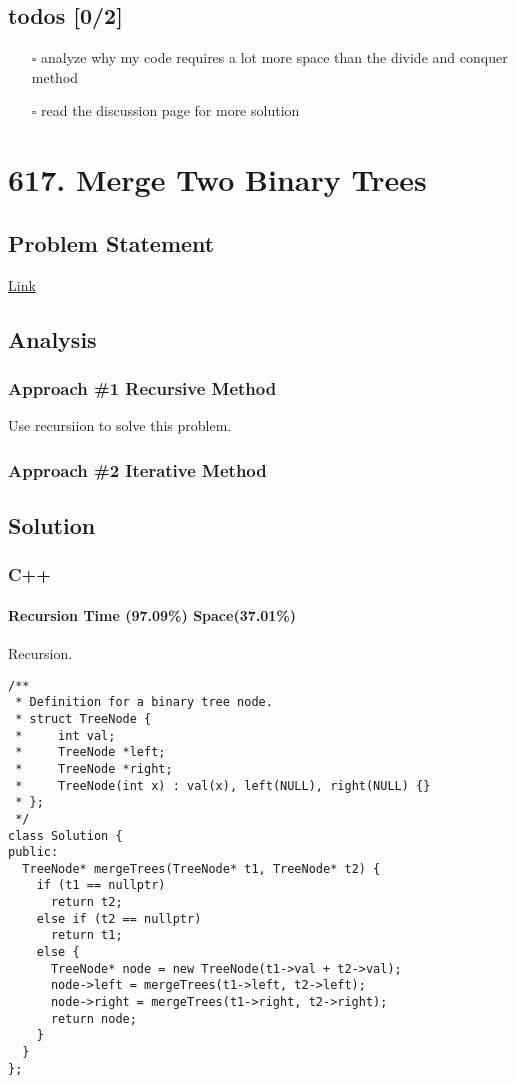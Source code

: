 \documentclass[12pt]{book}
\begin{document}
\section{todos [0/2]}
\label{sec:org4e9661b}
\begin{itemize}
\item[{$\square$}] analyze why my code requires a lot more space than the divide and conquer method
\item[{$\square$}] read the discussion page for more solution
\end{itemize}
\chapter{617. Merge Two Binary Trees}
\label{sec:org122f692}
\section{Problem Statement}
\label{sec:orgb48a669}
\href{https://leetcode.com/problems/merge-two-binary-trees/}{Link}
\section{Analysis}
\label{sec:org601b378}
\subsection{Approach \#1 Recursive Method}
\label{sec:orge739dc9}
Use recursiion to solve this problem.
\subsection{Approach \#2 Iterative Method}
\label{sec:orgbe9beec}

\section{Solution}
\label{sec:orgec7a7c1}
\subsection{C++}
\label{sec:org814d047}
\subsubsection{Recursion Time (97.09\%) Space(37.01\%)}
\label{sec:orgc77e2a7}
Recursion.
\begin{verbatim}
/**
 * Definition for a binary tree node.
 * struct TreeNode {
 *     int val;
 *     TreeNode *left;
 *     TreeNode *right;
 *     TreeNode(int x) : val(x), left(NULL), right(NULL) {}
 * };
 */
class Solution {
public:
  TreeNode* mergeTrees(TreeNode* t1, TreeNode* t2) {
    if (t1 == nullptr)
      return t2;
    else if (t2 == nullptr)
      return t1;
    else {
      TreeNode* node = new TreeNode(t1->val + t2->val);
      node->left = mergeTrees(t1->left, t2->left);
      node->right = mergeTrees(t1->right, t2->right);
      return node;
    }
  }
};
\end{verbatim}
\end{document}
